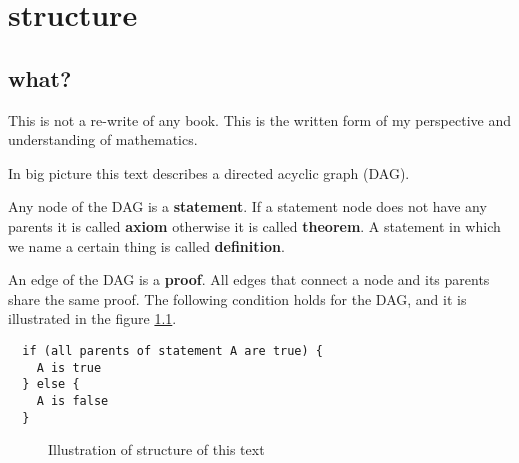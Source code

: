 \documentclass[./main.tex]{subfiles}
\begin{document}
\chapter{structure}
\section{what?}
This is not a re-write of any book.
This is the written form of my perspective and understanding of mathematics.

In big picture this text describes a directed acyclic graph (DAG).

Any node of the DAG is a \textbf{statement}.
If a statement node does not have any parents it is called \textbf{axiom} otherwise it is called \textbf{theorem}.
A statement in which we name a certain thing is called \textbf{definition}.

An edge of the DAG is a \textbf{proof}.
All edges that connect a node and its parents share the same proof.
The following condition holds for the DAG, and it is illustrated in the figure \ref{fig:structure_of_text}.

\begin{center}
\begin{verbatim}
  if (all parents of statement A are true) {
    A is true
  } else {
    A is false
  }
\end{verbatim}
\end{center}

\begin{figure}[ht]
	\centering
	\caption{Illustration of structure of this text}
	\label{fig:structure_of_text}
\end{figure}
\end{document}
